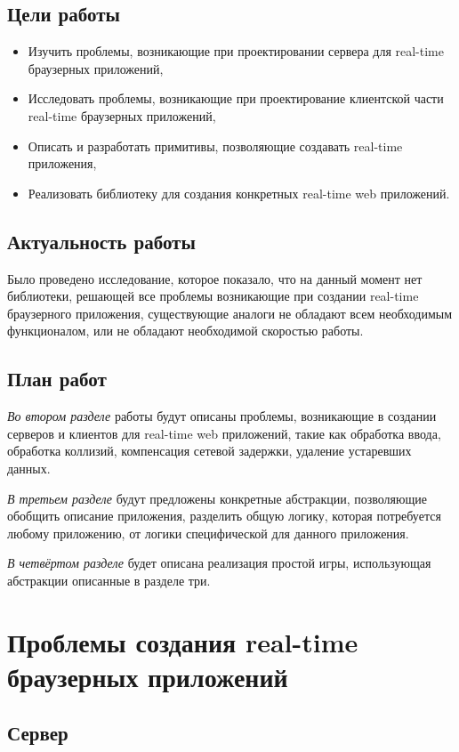 \documentclass[a4paper,14pt, openany]{book}
\begin{document}
\section{Цели работы}

\begin{itemize}
  \item Изучить проблемы, возникающие при проектировании сервера для real-time браузерных приложений,
  \item Исследовать проблемы, возникающие при проектирование клиентской части real-time браузерных приложений,
  \item Описать и разработать примитивы, позволяющие создавать real-time приложения,
  \item Реализовать библиотеку для создания конкретных real-time web приложений.
\end{itemize}

\section{Актуальность работы}

Было проведено исследование, которое показало, что на данный момент нет библиотеки, решающей все проблемы возникающие при создании real-time браузерного приложения, существующие аналоги не обладают всем необходимым функционалом, или не обладают необходимой скоростью работы.

\section{План работ}
\emph{Во втором разделе} работы будут описаны проблемы, возникающие в создании серверов и клиентов для real-time web приложений, такие как обработка ввода, обработка коллизий, компенсация сетевой задержки, удаление устаревших данных. 

\emph{В третьем разделе} будут предложены конкретные абстракции, позволяющие обобщить описание приложения, разделить общую логику, которая потребуется любому приложению, от логики специфической для данного приложения. 

\emph{В четвёртом разделе} будет описана реализация простой игры, использующая абстракции описанные в разделе три.


\chapter{Проблемы создания  real-time браузерных приложений}

\section{Сервер}
\end{document}
